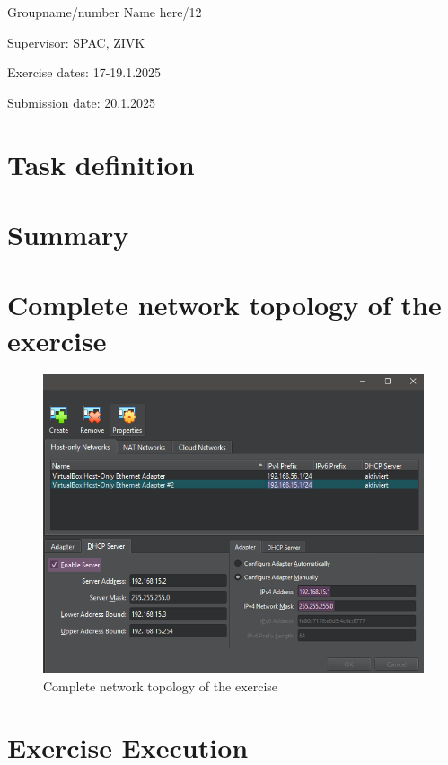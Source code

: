 \documentclass[a4paper]{article}
\newcommand{\abc}{\hfill \break}
\begin{document}
Groupname/number Name here/12

Supervisor: 	SPAC, ZIVK

Exercise dates: 17-19.1.2025

Submission date: 20.1.2025


\newpage
\tableofcontents

\newpage

\section{Task definition}



\section{Summary}

\newpage

\section{Complete network topology of the exercise}
\begin{figure}[h]
	\includegraphics[scale=0.4]{./images/nwipsfr.png}
	\centering
	\caption{Complete network topology of the exercise}
\end{figure}\abc

\newpage

\section{Exercise Execution}
\end{document}
